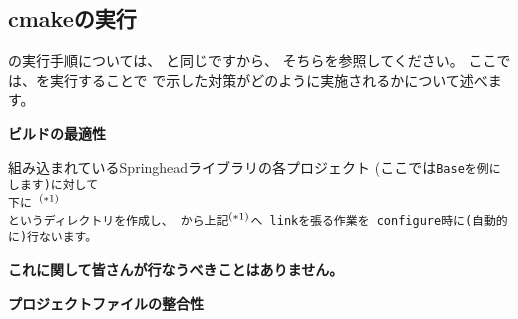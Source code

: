 \subsection{cmakeの実行}
\label{subsec:CmakeApplication}

\noindent
\cmake の実行手順については、
と同じですから、
そちらを参照してください。
ここでは、\cmake を実行することで
で示した対策がどのように実施されるかについて述べます。

\bigskip
\noindent
\bf{ビルドの最適性}
\begin{narrow}[20pt]
	組み込まれているSpringheadライブラリの各プロジェクト
	(ここでは\tt{Base}を例にします)に対して\\
	\hspace{20pt}下に
	$^{\small (*1)}$\\
	というディレクトリを作成し、
	から上記$^{\small (*1)}$へ
	linkを張る作業を\cmake\ configure時に(自動的に)行ないます。

	\bf{これに関して皆さんが行なうべきことはありません。}
\end{narrow}	

\bigskip
\noindent
\bf{プロジェクトファイルの整合性}
\begin{narrow}[20pt]



\end{narrow}	

